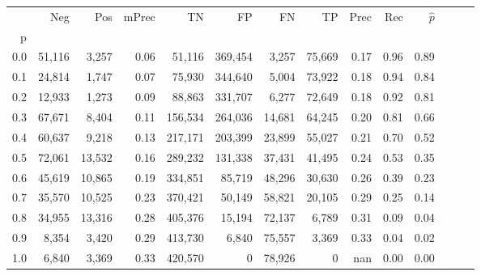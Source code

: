 \begin{tabular}{rrrrrrrrrrrrrr}
\toprule
{} &     Neg &     Pos & mPrec &       TN &       FP &      FN &      TP &  Prec &   Rec & $\hat{p}$ \\
p   &         &         &       &          &          &         &         &       &       &           \\
\midrule
0.0 &  51,116 &   3,257 &  0.06 &   51,116 &  369,454 &   3,257 &  75,669 &  0.17 &  0.96 &      0.89 \\
0.1 &  24,814 &   1,747 &  0.07 &   75,930 &  344,640 &   5,004 &  73,922 &  0.18 &  0.94 &      0.84 \\
0.2 &  12,933 &   1,273 &  0.09 &   88,863 &  331,707 &   6,277 &  72,649 &  0.18 &  0.92 &      0.81 \\
0.3 &  67,671 &   8,404 &  0.11 &  156,534 &  264,036 &  14,681 &  64,245 &  0.20 &  0.81 &      0.66 \\
0.4 &  60,637 &   9,218 &  0.13 &  217,171 &  203,399 &  23,899 &  55,027 &  0.21 &  0.70 &      0.52 \\
0.5 &  72,061 &  13,532 &  0.16 &  289,232 &  131,338 &  37,431 &  41,495 &  0.24 &  0.53 &      0.35 \\
0.6 &  45,619 &  10,865 &  0.19 &  334,851 &   85,719 &  48,296 &  30,630 &  0.26 &  0.39 &      0.23 \\
0.7 &  35,570 &  10,525 &  0.23 &  370,421 &   50,149 &  58,821 &  20,105 &  0.29 &  0.25 &      0.14 \\
0.8 &  34,955 &  13,316 &  0.28 &  405,376 &   15,194 &  72,137 &   6,789 &  0.31 &  0.09 &      0.04 \\
0.9 &   8,354 &   3,420 &  0.29 &  413,730 &    6,840 &  75,557 &   3,369 &  0.33 &  0.04 &      0.02 \\
1.0 &   6,840 &   3,369 &  0.33 &  420,570 &        0 &  78,926 &       0 &   nan &  0.00 &      0.00 \\
\bottomrule
\end{tabular}
